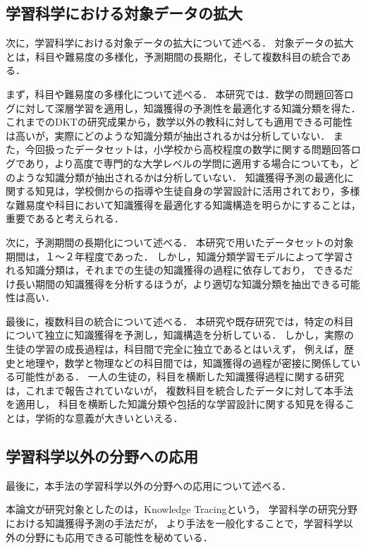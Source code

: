 \subsection{学習科学における対象データの拡大}
次に，学習科学における対象データの拡大について述べる．
対象データの拡大とは，科目や難易度の多様化，予測期間の長期化，そして複数科目の統合である．


まず，科目や難易度の多様化について述べる．
本研究では．数学の問題回答ログに対して深層学習を適用し，知識獲得の予測性を最適化する知識分類を得た．
これまでのDKTの研究成果から，数学以外の教科に対しても適用できる可能性は高いが，実際にどのような知識分類が抽出されるかは分析していない．
また，今回扱ったデータセットは，小学校から高校程度の数学に関する問題回答ログであり，より高度で専門的な大学レベルの学問に適用する場合についても，どのような知識分類が抽出されるかは分析していない．
知識獲得予測の最適化に関する知見は，学校側からの指導や生徒自身の学習設計に活用されており，多様な難易度や科目において知識獲得を最適化する知識構造を明らかにすることは，重要であると考えられる．


次に，予測期間の長期化について述べる．
本研究で用いたデータセットの対象期間は，１〜２年程度であった．
しかし，知識分類学習モデルによって学習される知識分類は，それまでの生徒の知識獲得の過程に依存しており，
できるだけ長い期間の知識獲得を分析するほうが，より適切な知識分類を抽出できる可能性は高い．


最後に，複数科目の統合について述べる．
本研究や既存研究では，特定の科目について独立に知識獲得を予測し，知識構造を分析している．
しかし，実際の生徒の学習の成長過程は，科目間で完全に独立であるとはいえず，
例えば，歴史と地理や，数学と物理などの科目間では，知識獲得の過程が密接に関係している可能性がある．
一人の生徒の，科目を横断した知識獲得過程に関する研究は，これまで報告されていないが，
複数科目を統合したデータに対して本手法を適用し，
科目を横断した知識分類や包括的な学習設計に関する知見を得ることは，学術的な意義が大きいといえる．


\subsection{学習科学以外の分野への応用}
最後に，本手法の学習科学以外の分野への応用について述べる．

本論文が研究対象としたのは，Knowledge Tracingという，
学習科学の研究分野における知識獲得予測の手法だが，
より手法を一般化することで，学習科学以外の分野にも応用できる可能性を秘めている．

